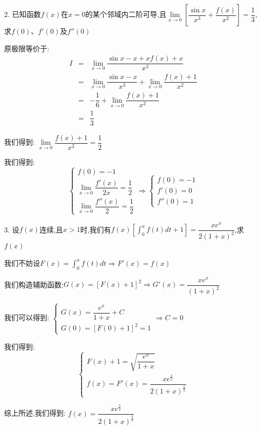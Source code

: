 2. 已知函数$f(x)$在$x=0$的某个邻域内二阶可导,且$\lim\limits_{x\rightarrow 0 }\left[ \dfrac{\sin x}{x^3}+\dfrac{f(x)}{x^2}\right]=\dfrac{1}{3}$,求$f(0)$、$f'(0)$及$f''(0)$
\begin{solution}

	原极限等价于:  
	\begin{eqnarray*}
		I&=&\lim\limits_{x\rightarrow 0 } \dfrac{\sin x-x+xf(x)+x}{x^3}\\
		&=&\lim\limits_{x\rightarrow 0 } \dfrac{\sin x-x}{x^3}+\lim\limits_{x\rightarrow 0 } \dfrac{f(x)+1}{x^2}\\
		&=&-\dfrac{1}{6}+\lim\limits_{x\rightarrow 0 } \dfrac{f(x)+1}{x^2}\\
		&=&\dfrac{1}{3}
	\end{eqnarray*}

	我们得到:  $\lim\limits_{x\rightarrow 0 } \dfrac{f(x)+1}{x^2}=\dfrac{1}{2}$
	
	我们得到:  
	$$\left\lbrace
	\begin{array}{l}
		f(0)=-1\\
		\lim\limits_{x\rightarrow 0}\dfrac{f'(x)}{2x}=\dfrac{1}{2}\\
		\lim\limits_{x\rightarrow 0}\dfrac{f''(x)}{2}=\dfrac{1}{2}
	\end{array}
	\right. \Rightarrow \left\lbrace
	\begin{array}{l}
		f(0)=-1\\
		f'(0)=0\\
		f''(0)=1
	\end{array}
	\right. $$
\end{solution}

3. 设$f(x)$连续,且$x>1$时,我们有$f(x)\left[ \int_{0}^{x}f(t)dt+1\right]=\dfrac{xe^x}{2(1+x)^2}$,求$f(x)$
\begin{solution}

	我们不妨设$F(x)=\int_{0}^{x}f(t)dt\Rightarrow F'(x)=f(x)$
	
	我们构造辅助函数:$G(x)=\left[F(x)+1\right]^2\Rightarrow G'(x)=\dfrac{xe^x}{(1+x)^2}$
	
	我们可以得到:  $\left\lbrace
	\begin{array}{l}
		G(x)=\dfrac{e^x}{1+x}+C\\ G(0)=[F(0)+1]^2=1
	\end{array}
	\right. \Rightarrow C=0$
	
	我们得到:  $$\left\lbrace
	\begin{array}{l}
		F(x)+1=\sqrt{\dfrac{e^x}{1+x}}\\
		f(x)=F'(x)=\dfrac{xe^{\frac{x}{2}}}{2(1+x)^{\frac{3}{2}}}
	\end{array}
	\right. $$
	
	综上所述,我们得到:  $f(x)=\dfrac{xe^{\frac{x}{2}}}{2(1+x)^{\frac{3}{2}}}$
\end{solution}

